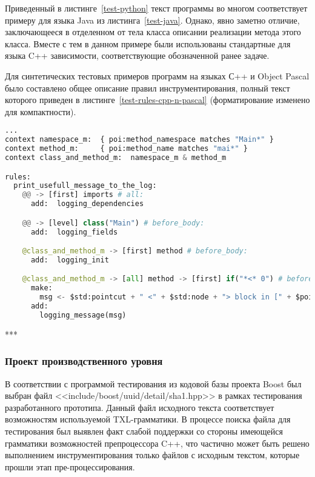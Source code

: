 Приведенный в листинге~\ref{test-python} текст программы во многом соответствует примеру для языка Java из листинга~\ref{test-java}.
Однако, явно заметно отличие, заключающееся в отделенном от тела класса описании реализации метода этого класса.
Вместе с тем в данном примере были использованы стандартные для языка C++ зависимости, соответствующие обозначенной ранее задаче.

Для синтетических тестовых примеров программ на языках С++ и Object Pascal было составлено общее описание правил инструментирования, полный текст которого приведен в листинге~\ref{test-rules-cpp-n-pascal} (форматирование изменено для компактности).

\begin{lstlisting}[frame=single, language=Python, label={test-rules-cpp-n-pascal}, caption={Описание правил инструментирования.}]
...
context namespace_m:  { poi:method_namespace matches "Main*" }
context method_m:     { poi:method_name matches "mai*" }
context class_and_method_m:  namespace_m & method_m

rules:
  print_usefull_message_to_the_log:
    @@ -> [first] imports # all:
      add:  logging_dependencies

    @@ -> [level] class("Main") # before_body:
      add:  logging_fields

    @class_and_method_m -> [first] method # before_body:
      add:  logging_init

    @class_and_method_m -> [all] method -> [first] if("*<* 0") # before:
      make:
        msg <- $std:pointcut + " <" + $std:node + "> block in [" + $poi:method_name_full + "] method";
      add:
        logging_message(msg)
\end{lstlisting}

***

\subsubsection{Проект производственного уровня}

В соответствии с программой тестирования из кодовой базы проекта Boost был выбран файл <<include/boost/uuid/detail/sha1.hpp>> в рамках тестирования разработанного прототипа.
Данный файл исходного текста соответствует возможностям используемой TXL-грамматики.
В процессе поиска файла для тестирования был выявлен факт слабой поддержки со стороны имеющейся грамматики возможностей препроцессора C++, что частично может быть решено выполнением инструментирования только файлов с исходным текстом, которые прошли этап пре-процессирования.

